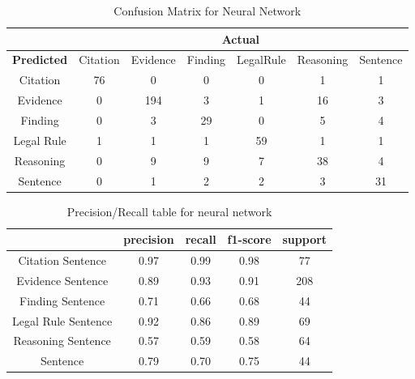 \documentclass[11pt]{article}
\begin{document}
\vspace{1.4em}
\begin{table}[h]
  \centering
  \begin{tabular}{| c| c| c| c| c| c| c|}
    \hline
    & \multicolumn{6}{|c|}{\textbf{Actual}} \\
    \hline
    \textbf{Predicted}  &  Citation & Evidence & Finding &LegalRule &  Reasoning & Sentence \\
    \hline
    Citation &        76 &     0 &    0 &      0 &        1 &   1  \\
    Evidence &        0 &   194 &    3 &      1 &        16&   3\\
    Finding &         0 &      3 &   29 &     0 &        5 &   4 \\
    Legal Rule &       1 &      1 &   1 &      59 &        1 &  1 \\
    Reasoning &       0 &      9 &  9 &        7 &      38 &   4  \\
    Sentence &        0 &      1 &  2 &        2 &       3 &  31 \\
    \hline
  \end{tabular}
  \caption{Confusion Matrix for Neural Network}
  \label{table:NN}
\end{table}
\vspace{0.3em}


\vspace{1.4em}
\begin{table}
  \centering
  \begin{tabular}{| c | c | c | c | c |}
    \hline
    &                   precision  &   recall &  f1-score  &  support \\
    \hline
    Citation Sentence &      0.97 &     0.99 &     0.98 &       77 \\
    Evidence Sentence &      0.89 &     0.93 &     0.91 &      208 \\
    Finding Sentence &      0.71 &     0.66 &     0.68 &       44 \\
    Legal Rule Sentence &       0.92 &     0.86 &     0.89 &       69 \\
    Reasoning Sentence &      0.57 &     0.59 &     0.58 &       64 \\
    Sentence &      0.79 &     0.70 &     0.75 &       44 \\
    \hline
  \end{tabular}
  \caption{Precision/Recall table for neural network}
  \label{table:prNN}
\end{table}
\vspace{0.3em}
\end{document}
